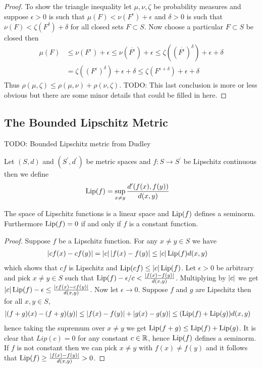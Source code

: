 \begin{proof}
To show the triangle inequality let $\mu, \nu, \zeta$ be probability
measures and suppose $\epsilon > 0$ is such that $\mu(F) <
\nu(F^\epsilon) + \epsilon$ and $\delta > 0$ is such that $\nu(F) <
\zeta(F^\delta) + \delta$ for all closed sets $F \subset S$.  Now
choose a particular $F \subset S$ be closed then
\begin{align*}
\mu(F) 
&\leq \nu(F^\epsilon) + \epsilon 
\leq \nu(\overline{F^\epsilon})+ \epsilon 
\leq \zeta((\overline{F^\epsilon})^\delta)+ \epsilon + \delta \\
&=\zeta((F^\epsilon)^\delta)+ \epsilon + \delta 
\leq \zeta(F^{\epsilon+\delta})+ \epsilon + \delta
\end{align*}
Thus $\rho(\mu, \zeta) \leq \rho(\mu, \nu) + \rho(\nu, \zeta)$.  TODO:
This last conclusion is more or less obvious but there are some minor details that
could be filled in here.
\end{proof}

\subsection{The Bounded Lipschitz Metric}

TODO: Bounded Lipschitz metric from Dudley

\begin{defn}Let $(S,d)$ and $(S^\prime, d^\prime)$ be metric spaces and $f : S \to S^\prime$ be Lipschitz continuous then we define 
\begin{align*}
\operatorname*{Lip}(f) &= \sup_{x \neq y} \frac{d^\prime(f(x), f(y))}{d(x,y)}
\end{align*}
\end{defn}

\begin{lem}\label{LipschitzSeminorm}The space of Lipschitz functions is a linear space and $\operatorname*{Lip}(f)$ defines a seminorm.  Furthermore $\operatorname*{Lip}(f) = 0$ if and only if $f$ is a constant function.
\end{lem}
\begin{proof}
Suppose $f$ be a Lipschitz function. For any $x \neq y \in S$ we have 
\begin{align*}
\left \vert cf(x) - cf(y) \right \vert &= \left \vert c \right \vert\left \vert f(x) - f(y) \right \vert \leq \left \vert c \right \vert \operatorname*{Lip}(f) d(x,y)
\end{align*}
which shows that $cf$ is Lipschitz and $\operatorname*{Lip}(cf) \leq \left \vert c \right \vert \operatorname*{Lip}(f)$.  Let $\epsilon >0$ be arbitrary and pick $x \neq y \in S$ such that $\operatorname*{Lip}(f) - \epsilon/c < \frac{\left \vert f(x) - f(y) \right \vert}{d(x,y)}$.  Multiplying  by $\left \vert c \right \vert$ we get $\left \vert c \right \vert \operatorname*{Lip}(f) - \epsilon \leq \frac{\left \vert cf(x) - cf(y) \right \vert}{d(x,y)}$.  Now let $\epsilon \to 0$.  Suppose $f$ and $g$ are Lipschitz then for all $x,y \in S$,
\begin{align*}
\left \vert (f+g)(x) - (f+g)(y) \right \vert &\leq \left \vert f(x) - f(y) \right \vert + \left \vert g(x) - g(y) \right \vert \leq (\operatorname*{Lip}(f) + \operatorname*{Lip}(g)) d(x,y)
\end{align*}
hence taking the supremum over $x \neq y$ we get $\operatorname*{Lip}(f+g) \leq \operatorname*{Lip}(f) + \operatorname*{Lip}(g)$.  It is clear that $Lip(c) = 0$ for any constant $c \in \mathbb{R}$, hence $\operatorname*{Lip}(f)$ defines a seminorm.  If $f$ is not constant then we can pick $x \neq y$ with $f(x) \neq f(y)$ and it follows that $\operatorname*{Lip}(f) \geq \frac{\left \vert f(x) - f(y) \right \vert}{d(x,y)} > 0$.
\end{proof}

